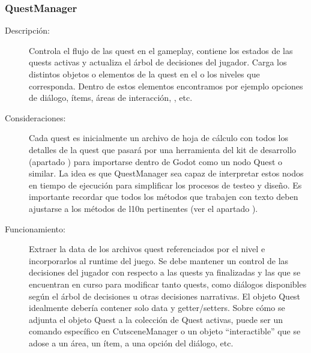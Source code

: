 \subsubsection{QuestManager}\label{modelado:questmanager}
\begin{description}
	\item[Descripción:] Controla el flujo de las quest en el gameplay, contiene los estados de las quests activas y actualiza el árbol de decisiones del jugador. Carga los distintos objetos o elementos de la quest en el o los niveles que corresponda. Dentro de estos elementos encontramos por ejemplo opciones de diálogo, ítems, áreas de interacción, , etc.
	
	\item[Consideraciones:] Cada quest es inicialmente un archivo de hoja de cálculo con todos los detalles de la quest que pasará por una herramienta del kit de desarrollo (apartado ) para importarse dentro de Godot como un nodo Quest o similar. La idea es que QuestManager sea capaz de interpretar estos nodos en tiempo de ejecución para simplificar los procesos de testeo y diseño. Es importante recordar que todos los métodos que trabajen con texto deben ajustarse a los métodos de l10n pertinentes (ver el apartado ).
	
	\item[Funcionamiento:] Extraer la data de los archivos quest referenciados por el nivel e incorporarlos al runtime del juego. Se debe mantener un control de las decisiones del jugador con respecto a las quests ya finalizadas y las que se encuentran en curso para modificar tanto quests, como diálogos disponibles según el árbol de decisiones u otras decisiones narrativas. El objeto Quest idealmente debería contener solo data y getter/setters.
	Sobre cómo se adjunta el objeto Quest a la colección de Quest activas, puede ser un comando específico en CutsceneManager o un objeto “interactible” que se adose a un área, un ítem, a una opción del diálogo, etc.
\end{description}
	
